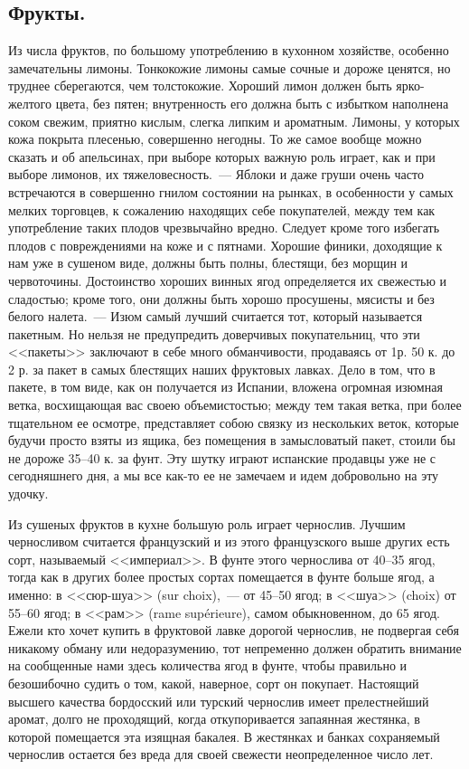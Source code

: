 \subsection{Фрукты.}
Из числа фруктов, по большому употреблению в кухонном хозяйстве, особенно замечательны лимоны. Тонкокожие лимоны самые сочные и дороже ценятся, но труднее сберегаются, чем толстокожие. Хороший лимон должен быть ярко-желтого цвета, без пятен; внутренность его должна быть с избытком наполнена соком свежим, приятно кислым, слегка липким и ароматным. Лимоны, у которых кожа покрыта плесенью, совершенно негодны. То же самое вообще можно сказать и об апельсинах, при выборе которых важную роль играет, как и при выборе лимонов, их тяжеловесность.~--- Яблоки и даже груши очень часто встречаются в совершенно гнилом состоянии на рынках, в особенности у самых мелких торговцев, к сожалению находящих себе покупателей, между тем как употребление таких плодов чрезвычайно вредно. Следует кроме того избегать плодов с повреждениями на коже и с пятнами. Хорошие финики, доходящие к нам уже в сушеном виде, должны быть полны, блестящи, без морщин и червоточины. Достоинство хороших винных ягод определяется их свежестью и сладостью; кроме того, они должны быть хорошо просушены, мясисты и без белого налета.~--- Изюм самый лучший считается тот, который называется пакетным. Но нельзя не предупредить доверчивых покупательниц, что эти <<пакеты>> заключают в себе много обманчивости, продаваясь от 1р. 50 к. до 2 р. за пакет в самых блестящих наших фруктовых лавках. Дело в том, что в пакете, в том виде, как он получается из Испании, вложена огромная изюмная ветка, восхищающая вас своею объемистостью; между тем такая ветка, при более тщательном ее осмотре, представляет собою связку из нескольких веток, которые будучи просто взяты из ящика, без помещения в замысловатый пакет, стоили бы не дороже 35–40 к. за фунт. Эту шутку играют испанские продавцы уже не с сегодняшнего дня, а мы все как-то ее не замечаем и идем добровольно на эту удочку.

Из сушеных фруктов в кухне большую роль играет чернослив. Лучшим черносливом считается французский и из этого французского выше других есть сорт, называемый <<империал>>. В фунте этого чернослива от 40–35 ягод, тогда как в других более простых сортах помещается в фунте больше ягод, а именно: в <<сюр-шуа>> (sur choix),~--- от 45–50 ягод; в <<шуа>> (choix) от 55–60 ягод; в <<рам>> (rame supérieure), самом обыкновенном, до 65 ягод. Ежели кто хочет купить в фруктовой лавке дорогой чернослив, не подвергая себя никакому обману или недоразумению, тот непременно должен обратить внимание на сообщенные нами здесь количества ягод в фунте, чтобы правильно и безошибочно судить о том, какой, наверное, сорт он покупает. Настоящий высшего качества бордосский или турский чернослив имеет прелестнейший аромат, долго не проходящий, когда откупоривается запаянная жестянка, в которой помещается эта изящная бакалея. В жестянках и банках сохраняемый чернослив остается без вреда для своей свежести неопределенное число лет.


